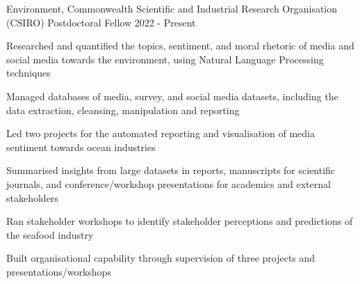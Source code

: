 


\begin{cventries}

  \cventry
    {Environment, Commonwealth Scientific and Industrial Research Organisation (CSIRO)} %
    {Postdoctoral Fellow} %
    {}%
    {2022 - Present} %
    { %
      \begin{cvitems}
        \item Researched and quantified the topics, sentiment, and moral rhetoric of media and social media towards the environment, using Natural Language Processing techniques
       \item Managed databases of media, survey, and social media datasets, including the data extraction, cleansing, manipulation and reporting
        \item Led two projects for the automated reporting and visualisation of media sentiment towards ocean industries
        \item Summarised insights from large datasets in reports, manuscripts for scientific journals, and conference/workshop presentations for academics and external stakeholders
        \item Ran stakeholder workshops to identify stakeholder perceptions and predictions of the seafood industry
        \item Built organisational capability through supervision of three projects and presentations/workshops
      \end{cvitems}
    }


\end{cventries}

